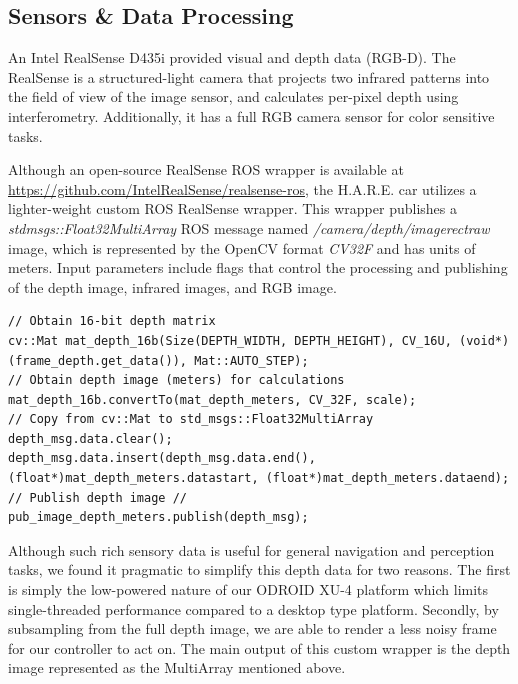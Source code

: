 \documentclass[letterpaper, 10 pt, conference]{ieeeconf}  %
\begin{document}
\subsection{Sensors \& Data Processing} \label{lineScan}

An Intel RealSense D435i provided visual and depth data (RGB-D). The RealSense is a structured-light camera that projects two infrared patterns into the field of view of the image sensor, and calculates per-pixel depth using interferometry. Additionally, it has a full RGB camera sensor for color sensitive tasks.

Although an open-source RealSense ROS wrapper is available at \url{https://github.com/IntelRealSense/realsense-ros}, the H.A.R.E. car utilizes a lighter-weight custom ROS RealSense wrapper. This wrapper publishes a \textit{std\textunderscore{}msgs::Float32MultiArray} ROS message named \textit{/camera/depth/image\textunderscore{}rect\textunderscore{}raw} image, which is represented by the OpenCV format \textit{CV\textunderscore{}32F} and has units of meters. Input parameters include flags that control the processing and publishing of the depth image, infrared images, and RGB image.

\begin{lstlisting}
// Obtain 16-bit depth matrix
cv::Mat mat_depth_16b(Size(DEPTH_WIDTH, DEPTH_HEIGHT), CV_16U, (void*)(frame_depth.get_data()), Mat::AUTO_STEP);
// Obtain depth image (meters) for calculations
mat_depth_16b.convertTo(mat_depth_meters, CV_32F, scale);
// Copy from cv::Mat to std_msgs::Float32MultiArray
depth_msg.data.clear();
depth_msg.data.insert(depth_msg.data.end(), (float*)mat_depth_meters.datastart, (float*)mat_depth_meters.dataend);
// Publish depth image //
pub_image_depth_meters.publish(depth_msg);
\end{lstlisting}

Although such rich sensory data is useful for general navigation and perception tasks, we found it pragmatic to simplify this depth data for two reasons. The first is simply the low-powered nature of our ODROID XU-4 platform which limits single-threaded performance compared to a desktop type platform. Secondly, by subsampling from the full depth image, we are able to render a less noisy frame for our controller to act on. The main output of this custom wrapper is the depth image represented as the MultiArray mentioned above.
\end{document}
